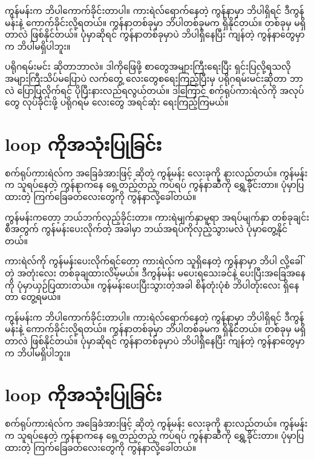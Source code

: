 \begin{sloppypar}
 ကွန်မန်းက ဘိပါကောက်ခိုင်းတာပါ။ ကားရဲလ်ရောက်နေတဲ့ ကွန်နာမှာ ဘိပါရှိရင် ဒီကွန်မန်းနဲ့ ကောက်ခိုင်းလို့ရတယ်။ ကွန်နာတစ်ခုမှာ ဘိပါတစ်ခုမက ရှိနိုင်တယ်။ တစ်ခုမှ မရှိတာလဲ ဖြစ်နိုင်တယ်။ ပုံမှာဆိုရင် ကွန်နာတစ်ခုမှာပဲ ဘိပါရှိနေပြီး ကျန်တဲ့ ကွန်နာတွေမှာက ဘိပါမရှိပါဘူး။

ပရိုဂရမ်းမင်း ဆိုတာဘာလဲ။ ဒါကိုဖြေဖို့ စာတွေအများကြီးရေးပြီး ရှင်းပြလို့ရသလို အများကြီးသိပ်မပြောပဲ လက်တွေ့  လေးတွေစရေးကြည့်ပြီးမှ ပရိုဂရမ်းမင်းဆိုတာ ဘာလဲ ပြောပြလိုက်ရင် ပိုပြီးနားလည်ရလွယ်တယ်။ ဒါ့ကြောင့် စက်ရုပ်ကားရဲလ်ကို အလုပ်တွေ လုပ်ခိုင်းဖို့ ပရိုဂရမ် လေးတွေ အရင်ဆုံး ရေးကြည့်ကြမယ်။
\section{{} loop ကိုအသုံးပြုခြင်း}

စက်ရုပ်ကားရဲလ်က အခြေခံအားဖြင့်  ဆိုတဲ့ ကွန်မန်း လေးခုကို နားလည်တယ်။  ကွန်မန်းက သူရပ်နေတဲ့ ကွန်နာကနေ ရှေ့တည့်တည့် ကပ်ရပ် ကွန်နာဆီကို ရွှေ့ခိုင်းတာ။ ပုံမှာပြထားတဲ့ ကြက်ခြေခတ်လေးတွေကို ကွန်နာလို့ခေါ်တယ်။ 

 ကွန်မန်းကတော့ ဘယ်ဘက်လှည့်ခိုင်းတာ။ ကားရဲမျက်နှာမူရာ အရပ်မျက်နှာ တစ်ခုချင်းစီအတွက်  ကွန်မန်းပေးလိုက်တဲ့ အခါမှာ ဘယ်အရပ်ကိုလှည့်သွားမလဲ ပုံမှာတွေ့နိုင်တယ်။

ကားရဲလ်ကို  ကွန်မန်းပေးလိုက်ရင်တော့ ကားရဲလ်က သူရှိနေတဲ့ ကွန်နာမှာ ဘိပါ လို့ခေါ်တဲ့ အတုံးလေး တစ်ခုချထားလိမ့်မယ်။ ဒီကွန်မန်း မပေးရသေးခင်နဲ့ ပေးပြီးအခြေအနေကို ပုံမှာယှဉ်ပြထားတယ်။ ကွန်မန်းပေးပြီးသွားတဲ့အခါ စိန်တုံးပုံစံ ဘိပါတုံးလေး ရှိနေတာ တွေ့ရမယ်။ 

 ကွန်မန်းက ဘိပါကောက်ခိုင်းတာပါ။ ကားရဲလ်ရောက်နေတဲ့ ကွန်နာမှာ ဘိပါရှိရင် ဒီကွန်မန်းနဲ့ ကောက်ခိုင်းလို့ရတယ်။ ကွန်နာတစ်ခုမှာ ဘိပါတစ်ခုမက ရှိနိုင်တယ်။ တစ်ခုမှ မရှိတာလဲ ဖြစ်နိုင်တယ်။ ပုံမှာဆိုရင် ကွန်နာတစ်ခုမှာပဲ ဘိပါရှိနေပြီး ကျန်တဲ့ ကွန်နာတွေမှာက ဘိပါမရှိပါဘူး။
\section{{} loop ကိုအသုံးပြုခြင်း}

စက်ရုပ်ကားရဲလ်က အခြေခံအားဖြင့်  ဆိုတဲ့ ကွန်မန်း လေးခုကို နားလည်တယ်။  ကွန်မန်းက သူရပ်နေတဲ့ ကွန်နာကနေ ရှေ့တည့်တည့် ကပ်ရပ် ကွန်နာဆီကို ရွှေ့ခိုင်းတာ။ ပုံမှာပြထားတဲ့ ကြက်ခြေခတ်လေးတွေကို ကွန်နာလို့ခေါ်တယ်။ 


\end{sloppypar}
